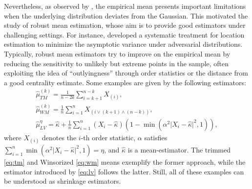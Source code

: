 \documentclass{article}
\theoremstyle{plain}
\theoremstyle{definition}
\begin{document}
Nevertheless, as observed by \cite{tukey1948some}, the empirical mean presents important limitations when the underlying distribution deviates from the Gaussian. This motivated the study of robust mean estimation, whose aim is to provide good estimators under challenging settings. For instance, \cite{huber1964robust} developed a systematic treatment for location estimation to minimize the asymptotic variance under adversarial distributions.
Typically, robust mean estimators try to improve on the empirical mean by reducing the sensitivity to unlikely but extreme points in the sample, often exploiting the idea of ``outlyingness'' through order statistics or the distance from a good centrality estimate. Some examples are given by the following estimators: 
\begin{gather}
  \widehat{\mu }_{TM}^{(k)}=\frac{1}{n-2k}\sum_{i=k+1}^{n-k} X_{(i)}, \label{eq:tm}\\
  \widehat{\mu }_{WM}^{(k)}=\frac{1}{n}\sum_{i=1}^{n} X_{(i\vee (k+1)\wedge (n-k))},  \label{eq:wm}\\
  \widehat{\mu}_{LV}^{\eta}=\widehat{\kappa }+ \frac{1}{n}\sum_{i=1}^{n} (X_i-\widehat{\kappa })(1-\min(\alpha^2 \lvert X_i -\widehat{\kappa }  \rvert^2, 1 )),  \label{eq:lv}
\end{gather}
where \( X_{(i)} \) denotes the \( i \)-th order statistic, \( \alpha  \) satisfies \( \sum_{i=1}^n\min(\alpha ^2 \lvert X_i - \widehat{\kappa }  \rvert^2, 1 ) = \eta \), and \( \widehat{\kappa }  \) is a mean-estimator.
The trimmed \eqref{eq:tm} and Winsorized \eqref{eq:wm} means \citep{tukey1963less, huber1964robust} exemplify the former approach, while the estimator introduced by \cite{lee2022optimal} \eqref{eq:lv} follows the latter. Still, all of these examples can be understood as shrinkage estimators.
\end{document}
